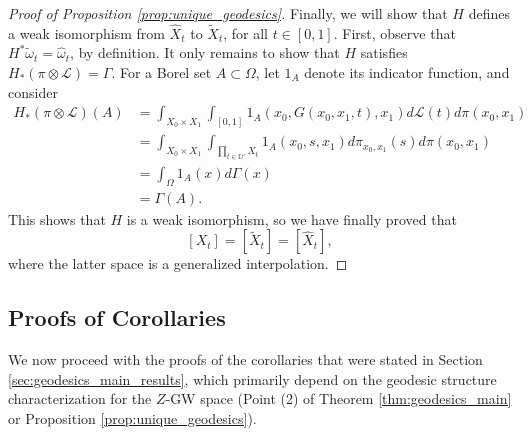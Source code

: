 \documentclass{article}
\theoremstyle{definition}
\begin{document}
\begin{proof}[Proof of Proposition \ref{prop:unique_geodesics}]
    Finally, we will show that $H$ defines a weak isomorphism from $\widehat{X}_t$ to $\widetilde{X}_t$, for all $t \in [0,1]$. First, observe that $H^\ast \tilde{\omega}_t = \hat{\omega}_t$, by definition. It only remains to show that $H$ satisfies $H_\ast(\pi\otimes \mathscr{L})=\Gamma$. For a Borel set $A \subset \Omega$, let $1_A$ denote its indicator function, and consider 
    \begin{align}
        H_*(\pi\otimes \mathscr{L})(A) &= \int_{X_0\times X_1}\int_{[0,1]}1_{A}(x_0,G(x_0,x_1,t),x_1)d\mathscr{L}(t) d\pi(x_0,x_1)\\ & =  \int_{X_0\times X_1}\int_{\prod_{t\in \mathbb{D}'} X_t}1_{A}(x_0,s,x_1)d\pi_{x_0,x_1}(s) d\pi(x_0,x_1) \\ &=\int_{\Omega}1_A(x)  d\Gamma(x) \\ 
        &= \Gamma(A).
    \end{align}
    This shows that $H$ is a weak isomorphism, so we have finally proved that 
    \[
    [X_t] = [\widetilde{X}_t] = [\widehat{X}_t],
    \]
    where the latter space is a generalized interpolation. 
\end{proof}

\subsection{Proofs of Corollaries}\label{subsec:proofs_of_corollaries}

We now proceed with the proofs of the corollaries that were stated in Section \ref{sec:geodesics_main_results}, which primarily depend on the geodesic structure characterization for the $Z$-GW space (Point (2) of Theorem \ref{thm:geodesics_main} or Proposition \ref{prop:unique_geodesics}). 
\end{document}

